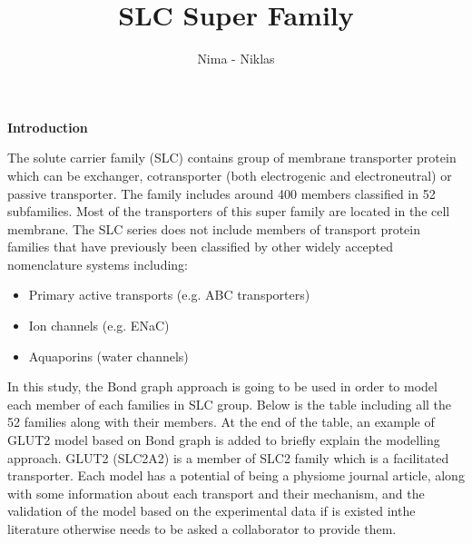 \documentclass[12pt]{report}
\title{SLC Super Family}
\author{Nima - Niklas}
\begin{document}
\maketitle
\textbf{Introduction}

The solute carrier family (SLC) contains group of membrane transporter protein which can be exchanger, cotransporter (both electrogenic and electroneutral) or passive transporter. The family includes around 400 members classified in 52 subfamilies. Most of the transporters of this super family are located in the cell membrane. 
The SLC series does not include members of transport protein families that have previously been classified by other widely accepted nomenclature systems including:
\begin{itemize}
    \item Primary active transports (e.g. ABC transporters)
    \item Ion channels (e.g. ENaC)
    \item Aquaporins (water channels)
\end{itemize}

In this study, the Bond graph approach is going to be used in order to model each member of each families in SLC group. Below is the table including all the 52 families along with their members. At the end of the table, an example of GLUT2 model based on Bond graph is added to briefly explain the modelling approach. GLUT2 (SLC2A2) is a member of SLC2 family which is a facilitated transporter.
Each model has a potential of being a physiome journal article, along with some information about each transport and their mechanism, and the validation of the model based on the experimental data if is existed inthe literature otherwise needs to be asked a collaborator to provide them. 




\end{document}
